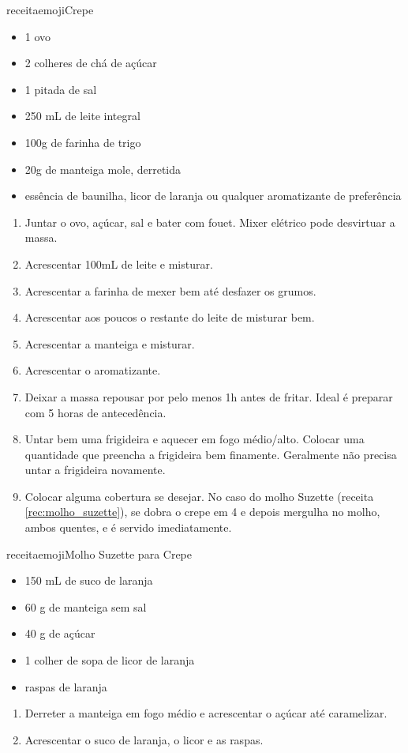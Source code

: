 receitaemoji{Crepe\label{rec:crepe}}{
	\begin{itemize}
		\item 1 ovo
		\item 2 colheres de chá de açúcar
		\item 1 pitada de sal
		\item 250 mL de leite integral
		\item 100g de farinha de trigo
		\item 20g de manteiga mole, derretida
		\item essência de baunilha, licor de laranja ou qualquer aromatizante de
		      preferência
	\end{itemize}
}{
	\begin{enumerate}
		\item Juntar o ovo, açúcar, sal e bater com fouet. Mixer elétrico pode
		      desvirtuar a massa.
		\item Acrescentar 100mL de leite e misturar.
		\item Acrescentar a farinha de mexer bem até desfazer os grumos.
		\item Acrescentar aos poucos o restante do leite de misturar bem.
		\item Acrescentar a manteiga e misturar.
		\item Acrescentar o aromatizante.
		\item Deixar a massa repousar por pelo menos 1h antes de fritar. Ideal é
		      preparar com 5 horas de antecedência.
		\item Untar bem uma frigideira e aquecer em fogo médio/alto. Colocar uma
		      quantidade que preencha a frigideira bem finamente. Geralmente não precisa
		      untar a frigideira novamente.
		\item Colocar alguma cobertura se desejar. No caso do molho Suzette (receita
		      \ref{rec:molho_suzette}), se dobra o crepe em 4 e depois mergulha no molho,
		      ambos quentes, e é servido imediatamente.
	\end{enumerate}
}

receitaemoji{Molho Suzette para Crepe\label{rec:molho_suzette}}{
	\begin{itemize}
		\item 150 mL de suco de laranja
		\item 60 g de manteiga sem sal
		\item 40 g de açúcar
		\item 1 colher de sopa de licor de laranja
		\item raspas de laranja
	\end{itemize}
}{
	\begin{enumerate}
		\item Derreter a manteiga em fogo médio e acrescentar o açúcar até
		      caramelizar.
		\item Acrescentar o suco de laranja, o licor e as raspas.
	\end{enumerate}
}

